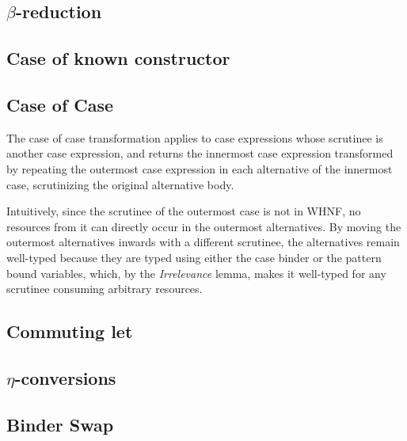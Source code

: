 \documentclass[acmsmall,review,screen]{acmart}
\begin{document}
\subsection{\texorpdfstring{$\beta$}{Beta}-reduction}



\subsection{Case of known constructor}



\subsection{Case of Case\label{sec:proof:caseofcase}}

The case of case transformation applies to case expressions whose scrutinee is
another case expression, and returns the innermost case expression transformed by repeating
the outermost case expression in each alternative of the innermost case,
scrutinizing the original alternative body.

Intuitively, since the scrutinee of the outermost case is not in WHNF, no
resources from it can directly occur in the outermost alternatives. By moving
the outermost alternatives inwards with a different scrutinee, the alternatives
remain well-typed because they are typed using either the case binder or the
pattern bound variables, which, by the \emph{Irrelevance} lemma, makes it
well-typed for any scrutinee consuming arbitrary resources.



\subsection{Commuting let}



\subsection{\texorpdfstring{$\eta$}{Eta}-conversions}



\subsection{Binder Swap}
\end{document}
